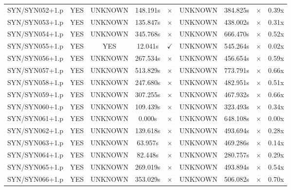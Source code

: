 \documentclass[a4paper,10pt]{article}
\begin{document}
\begin{longtable}{lcccccccc}
SYN/SYN052+1.p & YES & UNKNOWN & 148.191s & \cellcolor{mismatchcolor}$\times$ & UNKNOWN & 384.825s & \cellcolor{mismatchcolor}$\times$ & 0.39x \\
SYN/SYN053+1.p & YES & UNKNOWN & 135.847s & \cellcolor{mismatchcolor}$\times$ & UNKNOWN & 438.002s & \cellcolor{mismatchcolor}$\times$ & 0.31x \\
SYN/SYN054+1.p & YES & UNKNOWN & 345.768s & \cellcolor{mismatchcolor}$\times$ & UNKNOWN & 666.470s & \cellcolor{mismatchcolor}$\times$ & 0.52x \\
SYN/SYN055+1.p & YES & YES & 12.041s & \cellcolor{matchcolor}$\checkmark$ & UNKNOWN & 545.264s & \cellcolor{mismatchcolor}$\times$ & 0.02x \\
SYN/SYN056+1.p & YES & UNKNOWN & 267.534s & \cellcolor{mismatchcolor}$\times$ & UNKNOWN & 456.654s & \cellcolor{mismatchcolor}$\times$ & 0.59x \\
SYN/SYN057+1.p & YES & UNKNOWN & 513.829s & \cellcolor{mismatchcolor}$\times$ & UNKNOWN & 773.791s & \cellcolor{mismatchcolor}$\times$ & 0.66x \\
SYN/SYN058+1.p & YES & UNKNOWN & 247.680s & \cellcolor{mismatchcolor}$\times$ & UNKNOWN & 482.951s & \cellcolor{mismatchcolor}$\times$ & 0.51x \\
SYN/SYN059+1.p & YES & UNKNOWN & 307.255s & \cellcolor{mismatchcolor}$\times$ & UNKNOWN & 467.932s & \cellcolor{mismatchcolor}$\times$ & 0.66x \\
SYN/SYN060+1.p & YES & UNKNOWN & 109.439s & \cellcolor{mismatchcolor}$\times$ & UNKNOWN & 323.493s & \cellcolor{mismatchcolor}$\times$ & 0.34x \\
SYN/SYN061+1.p & YES & UNKNOWN & 0.000s & \cellcolor{mismatchcolor}$\times$ & UNKNOWN & 648.108s & \cellcolor{mismatchcolor}$\times$ & 0.00x \\
SYN/SYN062+1.p & YES & UNKNOWN & 139.618s & \cellcolor{mismatchcolor}$\times$ & UNKNOWN & 493.694s & \cellcolor{mismatchcolor}$\times$ & 0.28x \\
SYN/SYN063+1.p & YES & UNKNOWN & 63.957s & \cellcolor{mismatchcolor}$\times$ & UNKNOWN & 469.286s & \cellcolor{mismatchcolor}$\times$ & 0.14x \\
SYN/SYN064+1.p & YES & UNKNOWN & 82.448s & \cellcolor{mismatchcolor}$\times$ & UNKNOWN & 280.757s & \cellcolor{mismatchcolor}$\times$ & 0.29x \\
SYN/SYN065+1.p & YES & UNKNOWN & 269.019s & \cellcolor{mismatchcolor}$\times$ & UNKNOWN & 493.894s & \cellcolor{mismatchcolor}$\times$ & 0.54x \\
SYN/SYN066+1.p & YES & UNKNOWN & 353.029s & \cellcolor{mismatchcolor}$\times$ & UNKNOWN & 506.082s & \cellcolor{mismatchcolor}$\times$ & 0.70x \\

\end{longtable}
\end{document}
